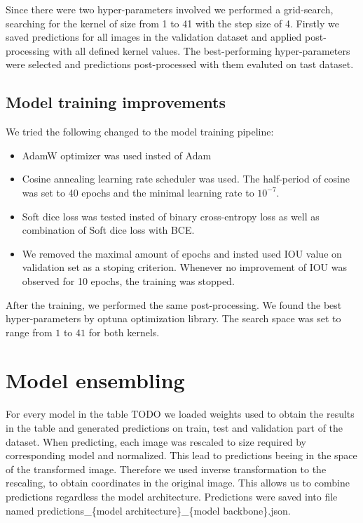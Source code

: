 Since there were two hyper-parameters involved we performed a grid-search, searching for the kernel of size from 1 to 41 with the step size of 4. Firstly we saved predictions for all images in the validation dataset and applied post-processing with all defined kernel values. The best-performing hyper-parameters were selected and predictions post-processed with them evaluted on tast dataset.

\subsection{Model training improvements}
We tried the following changed to the model training pipeline:
\begin{itemize}
    \item AdamW optimizer was used insted of Adam
    \item Cosine annealing learning rate scheduler was used. The half-period of cosine was set to 40 epochs and the minimal learning rate to $10^{-7}$.
    \item Soft dice loss was tested insted of binary cross-entropy loss as well as combination of Soft dice loss with BCE.
    \item We removed the maximal amount of epochs and insted used IOU value on validation set as a stoping criterion. Whenever no improvement of IOU was observed for 10 epochs, the training was stopped.
\end{itemize}

After the training, we performed the same post-processing. We found the best hyper-parameters by optuna optimization library. The search space was set to range from $1$ to $41$ for both kernels.




\section{Model ensembling}

For every model in the table TODO we loaded weights used to obtain the results in the table and generated predictions on train, test and validation part of the dataset. When predicting, each image was rescaled to size required by corresponding model and normalized. This lead to predictions beeing in the space of the transformed image. Therefore we used inverse transformation to the rescaling, to obtain coordinates in the original image. This allows us to combine predictions regardless the model architecture.
Predictions were saved into file named predictions\_\{model architecture\}\_\{model backbone\}.json.

